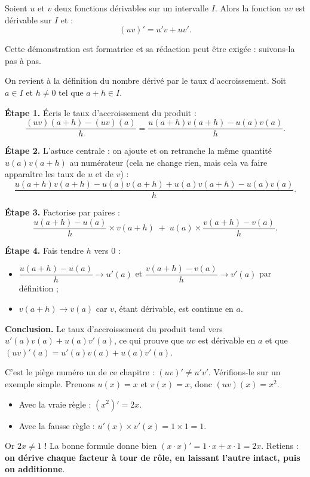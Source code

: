 \documentclass[11pt]{article}
\begin{document}
\begin{propriete}
Soient $u$ et $v$ deux fonctions dérivables sur un intervalle $I$. Alors la fonction $uv$ est dérivable sur $I$ et :
\[ (uv)' = u'v + uv'. \]
\end{propriete}

Cette démonstration est formatrice et sa rédaction peut être exigée : suivons-la pas à pas.

\begin{experience}[Démonstration guidée de $(uv)' = u'v + uv'$]
On revient à la définition du nombre dérivé par le taux d'accroissement. Soit $a \in I$ et $h \neq 0$ tel que $a+h \in I$.

\textbf{Étape 1.} Écris le taux d'accroissement du produit :
\[ \frac{(uv)(a+h) - (uv)(a)}{h} = \frac{u(a+h)v(a+h) - u(a)v(a)}{h}. \]

\textbf{Étape 2.} L'astuce centrale : on ajoute et on retranche la même quantité $u(a)v(a+h)$ au numérateur (cela ne change rien, mais cela va faire apparaître les taux de $u$ et de $v$) :
\[ \frac{u(a+h)v(a+h) - u(a)v(a+h) + u(a)v(a+h) - u(a)v(a)}{h}. \]

\textbf{Étape 3.} Factorise par paires :
\[ \frac{u(a+h) - u(a)}{h} \times v(a+h) \;+\; u(a) \times \frac{v(a+h) - v(a)}{h}. \]

\textbf{Étape 4.} Fais tendre $h$ vers $0$ :
\begin{itemize}
\item $\dfrac{u(a+h)-u(a)}{h} \to u'(a)$ et $\dfrac{v(a+h)-v(a)}{h} \to v'(a)$ par définition ;
\item $v(a+h) \to v(a)$ car $v$, étant dérivable, est continue en $a$.
\end{itemize}

\textbf{Conclusion.} Le taux d'accroissement du produit tend vers $u'(a)v(a) + u(a)v'(a)$, ce qui prouve que $uv$ est dérivable en $a$ et que $(uv)'(a) = u'(a)v(a) + u(a)v'(a)$.
\end{experience}

\begin{attention}
C'est le piège numéro un de ce chapitre : $(uv)' \neq u'v'$. Vérifions-le sur un exemple simple. Prenons $u(x) = x$ et $v(x) = x$, donc $(uv)(x) = x^2$.
\begin{itemize}
\item Avec la vraie règle : $(x^2)' = 2x$.
\item Avec la fausse règle : $u'(x) \times v'(x) = 1 \times 1 = 1$.
\end{itemize}
Or $2x \neq 1$ ! La bonne formule donne bien $(x \cdot x)' = 1 \cdot x + x \cdot 1 = 2x$. Retiens : \textbf{on dérive chaque facteur à tour de rôle, en laissant l'autre intact, puis on additionne}.
\end{attention}
\end{document}
